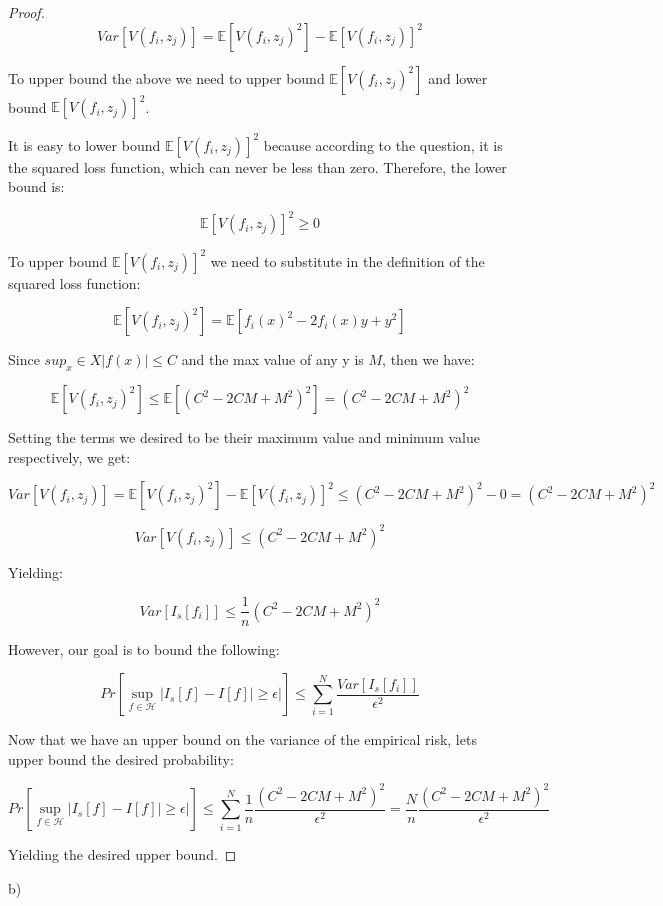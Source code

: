 \documentclass[12pt]{report}
\begin{document}
\begin{proof}
$$Var[V(f_i,z_j)] = \mathbb{E}[V(f_i,z_j)^2] - \mathbb{E}[V(f_i,z_j)]^2$$

To upper bound the above we need to upper bound $\mathbb{E}[V(f_i,z_j)^2]$ and lower bound $\mathbb{E}[V(f_i,z_j)]^2$. 

It is easy to lower bound $\mathbb{E}[V(f_i,z_j)]^2$ because according to the question, it is the squared loss function, which can never be less than zero. Therefore, the lower bound is:

$$\mathbb{E}[V(f_i,z_j)]^2 \geq 0$$

To upper bound  $\mathbb{E}[V(f_i,z_j)]^2$ we need to substitute in the definition of the squared loss function:

$$\mathbb{E}[V(f_i,z_j)^2] = \mathbb{E}[f_i(x)^2 - 2f_i(x)y + y^2] $$

Since $sup_x \in X |f(x)| \leq C$ and the max value of any y is $M$, then we have:


$$\mathbb{E}[V(f_i,z_j)^2] \leq \mathbb{E}[(C^2 - 2CM + M^2)^2] = (C^2 - 2CM + M^2)^2 $$

Setting the terms we desired to be their maximum value and minimum value respectively, we get:

$$Var[V(f_i,z_j)] = \mathbb{E}[V(f_i,z_j)^2] - \mathbb{E}[V(f_i,z_j)]^2 \leq (C^2 - 2CM + M^2)^2 - 0 = (C^2 - 2CM + M^2)^2 $$

$$Var[V(f_i,z_j)] \leq (C^2 - 2CM + M^2)^2$$

Yielding: 

$$Var[I_s[f_i]] \leq \frac{1}{n} (C^2 - 2CM + M^2)^2$$

However, our goal is to bound the following:

$$Pr[ \sup\limits_{f \in \mathcal{H}}  | I_s[f] - I[f] | \geq \epsilon|] \leq \sum^{N}_{i=1} \frac{ Var[I_s[f_i]] }{ \epsilon^2 }$$

Now that we have an upper bound on the variance of the empirical risk, lets upper bound the desired probability:

$$Pr[ \sup\limits_{f \in \mathcal{H}}  | I_s[f] - I[f] | \geq \epsilon|] \leq \sum^{N}_{i=1} \frac{1}{n} \frac{ (C^2 - 2CM + M^2)^2 }{ \epsilon^2 } = \frac{N}{n} \frac{ (C^2 - 2CM + M^2)^2 }{ \epsilon^2 }$$

Yielding the desired upper bound.
\end{proof}

b)

\end{document}
